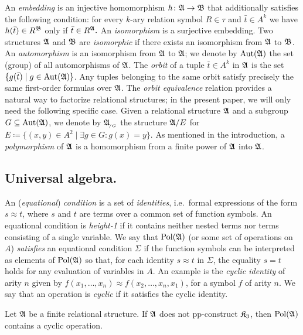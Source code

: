 An \emph{embedding} is an injective homomorphism $h\colon \mathfrak{A} \rightarrow \mathfrak{B}$ that additionally satisfies the following condition: for every $k$-ary relation symbol $R\in \tau$ and $\bar{t}\in A^{k}$ we have $h(\bar{t})\in R^{\mathfrak{B}}$ only if $\bar{t}\in R^{\mathfrak{A}}.$ 
%
An \emph{isomorphism} is a surjective embedding. Two structures $\mathfrak{A}$ and $\mathfrak{B}$ are \emph{isomorphic} if there exists an isomorphism from $\mathfrak{A} $ to $\mathfrak{B}$. 
%
An \emph{automorphism} is an isomorphism from $\mathfrak{A}$ to $\mathfrak{A}$; we denote by $\mathrm{Aut}(\mathfrak{A})$ the set (group) of all automorphisms of $\mathfrak{A}$.
% 
The \emph{orbit} of a tuple $\bar{t}\in A^{k}$ in $\mathfrak{A}$ is the set $\{g(\bar{t}) \mid g \in \mathrm{Aut}(\mathfrak{A})\}$.  Any tuples belonging to the same orbit satisfy precisely the same first-order formulas over $\mathfrak{A}$.  
%
The \emph{orbit equivalence} relation provides a natural way to factorize relational structures; in the present paper, we will only need the following specific case.
%
Given a relational structure $\mathfrak{A}$ and a subgroup $G\subseteq \mathrm{Aut}(\mathfrak{A})$,
% 
we denote by $\struct{A}_{\orbeq{G}}$ the structure $\mathfrak{A}/E$ for $E\coloneqq \{(x,y)\in A^2 \mid \exists g\in G\colon g(x)=y\}$.  
%
As mentioned in the introduction, a \emph{polymorphism} of $\mathfrak{A}$ is  a homomorphism from a finite power of $\mathfrak{A}$ into $\mathfrak{A}$. 
 

\subsection*{Universal algebra.}
%
An (\emph{equational}) \emph{condition} is a set of \emph{identities}, i.e.~formal
expressions of the form $s \approx t$, where $s$ and $t$ are terms over
a common set of function symbols. 
%
An equational condition is \emph{height-1} if it contains neither nested terms nor terms consisting of a single variable.
%
We say that $\mathrm{Pol}(\mathfrak{A})$ (or some set of operations on $A$) \emph{satisfies} an %
equational condition $\Sigma$ if the function symbols can be interpreted as elements of $\mathrm{Pol}(\mathfrak{A})$ so that, for each identity $s \approx t$ in $\Sigma$, the equality $s = t$ holds for any evaluation of variables in $A$. 
%  
An example is the \emph{cyclic identity} of arity $n$ given by $f(x_1,\dots, x_n) \approx f(x_2,\dots,x_n, x_1)$, for a symbol $f$ of arity $n$. 
%
We say that an operation is \emph{cyclic} if it satisfies the cyclic identity.

\begin{theorem}\label{thm:barto12} 
     Let $\mathfrak{A}$ be a finite relational structure. If $\mathfrak{A}$ does not pp-construct $\mathfrak{K}_3$, then $\mathrm{Pol}(\mathfrak{A})$ contains a cyclic operation.
\end{theorem}
 
